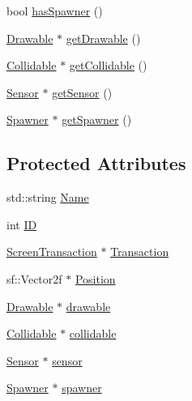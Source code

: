 \begin{DoxyCompactItemize}
\item 
bool \hyperlink{class_game_component_ae6e938bb93586ad8820316368065c174}{has\-Spawner} ()
\item 
\hyperlink{class_drawable}{Drawable} $\ast$ \hyperlink{class_game_component_a6b5db3e878b861296d6cc3a0f4ee6528}{get\-Drawable} ()
\item 
\hyperlink{class_collidable}{Collidable} $\ast$ \hyperlink{class_game_component_a09eae8038373202d058179080643f75b}{get\-Collidable} ()
\item 
\hyperlink{class_sensor}{Sensor} $\ast$ \hyperlink{class_game_component_afca864b925be82f9c54711c75dc7be12}{get\-Sensor} ()
\item 
\hyperlink{class_spawner}{Spawner} $\ast$ \hyperlink{class_game_component_ab6db9e2e5f501ca360b08a7fc6a19644}{get\-Spawner} ()
\end{DoxyCompactItemize}
\subsection*{Protected Attributes}
\begin{DoxyCompactItemize}
\item 
std\-::string \hyperlink{class_game_component_ab1037207fec65ac5fe65dec1e22f0566}{Name}
\item 
int \hyperlink{class_game_component_ac8d794e78280785eb956eaff044f74b2}{I\-D}
\item 
\hyperlink{class_screen_transaction}{Screen\-Transaction} $\ast$ \hyperlink{class_game_component_ae8c59f47f6723d108eb481a160607e98}{Transaction}
\item 
sf\-::\-Vector2f $\ast$ \hyperlink{class_game_component_acc3109bb4ae36112eb8796e067160c59}{Position}
\item 
\hyperlink{class_drawable}{Drawable} $\ast$ \hyperlink{class_game_component_acb73190345f4933825e9c8b8d5030438}{drawable}
\item 
\hyperlink{class_collidable}{Collidable} $\ast$ \hyperlink{class_game_component_aa91bd3600bd5964b55c7806dcfd1c862}{collidable}
\item 
\hyperlink{class_sensor}{Sensor} $\ast$ \hyperlink{class_game_component_ad585bf57df228afc83fbf777142e51bd}{sensor}
\item 
\hyperlink{class_spawner}{Spawner} $\ast$ \hyperlink{class_game_component_a15caaab21ec2e8eb9d438a25afbef4da}{spawner}
\end{DoxyCompactItemize}


